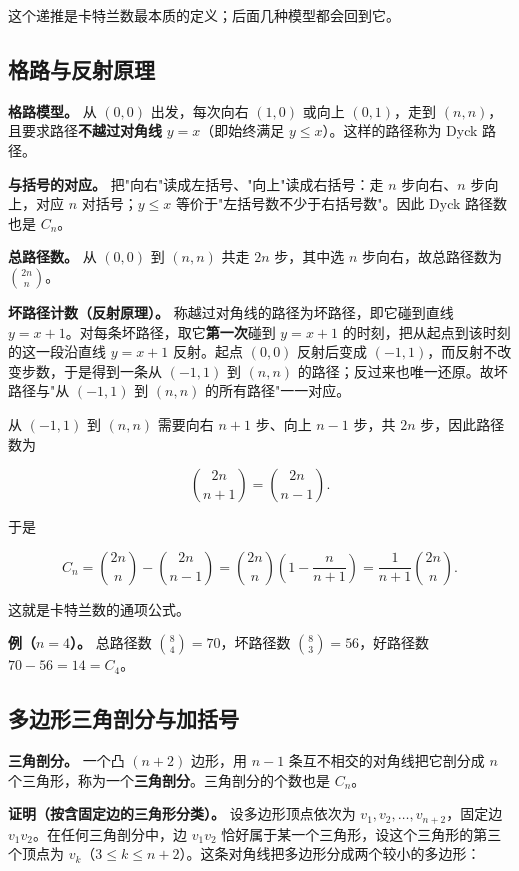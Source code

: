 这个递推是卡特兰数最本质的定义；后面几种模型都会回到它。

\subsection{格路与反射原理}


\textbf{格路模型。} 从 $(0,0)$ 出发，每次向右 $(1,0)$ 或向上 $(0,1)$，走到 $(n,n)$，且要求路径\textbf{不越过对角线} $y=x$（即始终满足 $y\le x$）。这样的路径称为 Dyck 路径。

\textbf{与括号的对应。} 把"向右"读成左括号、"向上"读成右括号：走 $n$ 步向右、$n$ 步向上，对应 $n$ 对括号；$y\le x$ 等价于"左括号数不少于右括号数"。因此 Dyck 路径数也是 $C_n$。

\textbf{总路径数。} 从 $(0,0)$ 到 $(n,n)$ 共走 $2n$ 步，其中选 $n$ 步向右，故总路径数为 $\binom{2n}{n}$。

\textbf{坏路径计数（反射原理）。} 称越过对角线的路径为坏路径，即它碰到直线 $y=x+1$。对每条坏路径，取它\textbf{第一次}碰到 $y=x+1$ 的时刻，把从起点到该时刻的这一段沿直线 $y=x+1$ 反射。起点 $(0,0)$ 反射后变成 $(-1,1)$，而反射不改变步数，于是得到一条从 $(-1,1)$ 到 $(n,n)$ 的路径；反过来也唯一还原。故坏路径与"从 $(-1,1)$ 到 $(n,n)$ 的所有路径"一一对应。

从 $(-1,1)$ 到 $(n,n)$ 需要向右 $n+1$ 步、向上 $n-1$ 步，共 $2n$ 步，因此路径数为

\[
\binom{2n}{n+1}=\binom{2n}{n-1}.
\]

于是

\[
C_n=\binom{2n}{n}-\binom{2n}{n-1}
=\binom{2n}{n}\left(1-\frac{n}{n+1}\right)
=\frac{1}{n+1}\binom{2n}{n}.
\]

这就是卡特兰数的通项公式。

\textbf{例（$n=4$）。} 总路径数 $\binom84=70$，坏路径数 $\binom83=56$，好路径数 $70-56=14=C_4$。

\subsection{多边形三角剖分与加括号}


\textbf{三角剖分。} 一个凸 $(n+2)$ 边形，用 $n-1$ 条互不相交的对角线把它剖分成 $n$ 个三角形，称为一个\textbf{三角剖分}。三角剖分的个数也是 $C_n$。

\textbf{证明（按含固定边的三角形分类）。} 设多边形顶点依次为 $v_1,v_2,\dots,v_{n+2}$，固定边 $v_1v_2$。在任何三角剖分中，边 $v_1v_2$ 恰好属于某一个三角形，设这个三角形的第三个顶点为 $v_k$（$3\le k\le n+2$）。这条对角线把多边形分成两个较小的多边形：

